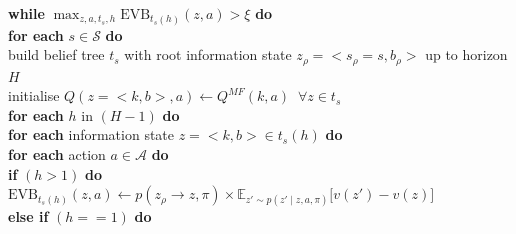 \documentclass{article}
\begin{document}
\bigbreak
\textbf{while} $\max_{z, a, t_{s}, h} \text{EVB}_{t_{s}(h)}(z, a) > \xi$ \textbf{do}\\
\hspace*{0.5cm} \textbf{for each} $s \in \mathcal{S}$ \textbf{do} \\
\hspace*{0.5cm} \hspace*{0.5cm} build belief tree $t_s$ with root information state $z_{\rho}=<s_{\rho}=s, b_{\rho}>$ up to horizon $H$\\
\hspace*{0.5cm} \hspace*{0.5cm} initialise $Q(z=<k, b>, a) \leftarrow Q^{MF}(k, a) \; \; \forall z \in t_{s}$\\
\hspace*{0.5cm} \hspace*{0.5cm} \textbf{for each} $h$ in $(H-1)$ \textbf{do}\\
\hspace*{0.5cm} \hspace*{0.5cm} \hspace*{0.5cm} \textbf{for each} information state $z=<k, b> \in t_s(h)$ \textbf{do}\\
\hspace*{0.5cm} \hspace*{0.5cm} \hspace*{0.5cm} \hspace*{0.5cm} \textbf{for each} action $a\in \mathcal{A}$ \textbf{do}\\
\hspace*{0.5cm} \hspace*{0.5cm} \hspace*{0.5cm} \hspace*{0.5cm} \hspace*{0.5cm} \textbf{if} $(h > 1)$ \textbf{do}\\
\hspace*{0.5cm} \hspace*{0.5cm} \hspace*{0.5cm} \hspace*{0.5cm} \hspace*{0.5cm} \hspace*{0.5cm} $\text{EVB}_{t_{s}(h)}(z, a) \leftarrow p(z_{\rho} \rightarrow z, \pi) \times \mathbb{E}_{z' \sim p(z' \mid z, a, \pi)}\big[v(z')-v(z)\big]$\\
\hspace*{0.5cm} \hspace*{0.5cm} \hspace*{0.5cm} \hspace*{0.5cm} \hspace*{0.5cm} \textbf{else if} $(h == 1)$ \textbf{do}\\
\end{document}
